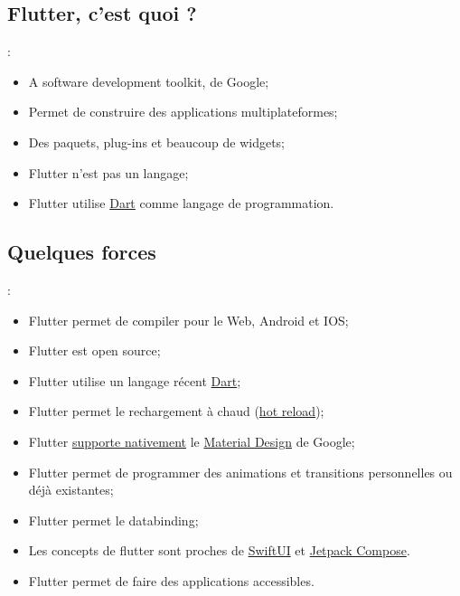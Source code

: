 \documentclass[10pt]{beamer}
\begin{document}
\subsection{Flutter, c'est quoi ?}
\begin{frame}[fragile,t]{\secname : \subsecname}
    \begin{itemize}
        \item A software development toolkit, de Google;
        \item Permet de construire des applications multiplateformes;
        \item Des paquets, plug-ins et beaucoup de widgets;
        \item Flutter n'est pas un langage;
        \item Flutter utilise \href{https://dart.dev}{Dart} comme langage de programmation.
    \end{itemize}
\end{frame}

\subsection{Quelques forces}
\begin{frame}[fragile,t]{\secname : \subsecname}
    \begin{itemize}
        \item Flutter permet de compiler pour le Web, Android et IOS;
        \item Flutter est open source;
        \item Flutter utilise un langage récent \href{https://dart.dev}{Dart};
        \item Flutter permet le rechargement à chaud (\href{https://flutter.dev/docs/development/tools/hot-reload}{hot reload});
        \item Flutter \href{https://flutter.dev/docs/development/ui/widgets/material}{supporte nativement} le \href{https://material.io/design/guidelines-overview}{Material Design} de Google;
        \item Flutter permet de programmer des animations et transitions personnelles ou déjà existantes;
        \item Flutter permet le databinding;
        \item Les concepts de flutter sont proches de \href{https://developer.apple.com/xcode/swiftui/}{SwiftUI} et \href{https://developer.android.com/jetpack/compose}{Jetpack Compose}.
        \item Flutter permet de faire des applications accessibles.
    \end{itemize}
\end{frame}
\end{document}
